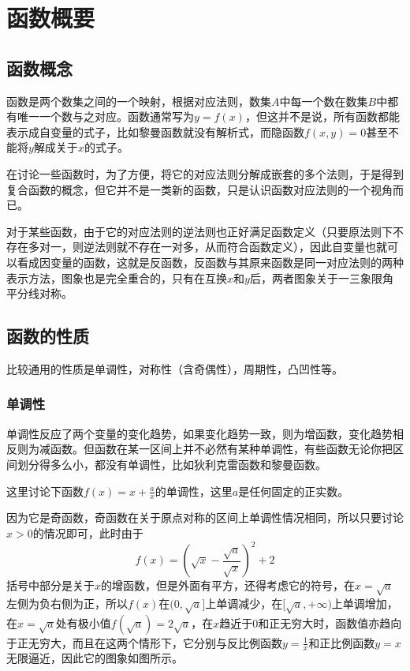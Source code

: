 
\section{函数概要}
\label{sec:function-general}


\subsection{函数概念}
\label{sec:function-general}

函数是两个数集之间的一个映射，根据对应法则，数集$A$中每一个数在数集$B$中都有唯一一个数与之对应。函数通常写为$y=f(x)$，但这并不是说，所有函数都能表示成自变量的式子，比如黎曼函数就没有解析式，而隐函数$f(x,y)=0$甚至不能将$y$解成关于$x$的式子。

在讨论一些函数时，为了方便，将它的对应法则分解成嵌套的多个法则，于是得到复合函数的概念，但它并不是一类新的函数，只是认识函数对应法则的一个视角而已。

对于某些函数，由于它的对应法则的逆法则也正好满足函数定义（只要原法则下不存在多对一，则逆法则就不存在一对多，从而符合函数定义），因此自变量也就可以看成因变量的函数，这就是反函数，反函数与其原来函数是同一对应法则的两种表示方法，图象也是完全重合的，只有在互换$x$和$y$后，两者图象关于一三象限角平分线对称。

\subsection{函数的性质}
\label{sec:function-general}

比较通用的性质是单调性，对称性（含奇偶性），周期性，凸凹性等。

\subsubsection{单调性}
\label{sec:function-general}

单调性反应了两个变量的变化趋势，如果变化趋势一致，则为增函数，变化趋势相反则为减函数。但函数在某一区间上并不必然有某种单调性，有些函数无论你把区间划分得多么小，都没有单调性，比如狄利克雷函数和黎曼函数。

这里讨论下函数$f(x)=x+\frac{a}{x}$的单调性，这里$a$是任何固定的正实数。

因为它是奇函数，奇函数在关于原点对称的区间上单调性情况相同，所以只要讨论$x>0$的情况即可，此时由于
$$
f(x)=\left( \sqrt{x}-\frac{\sqrt{a}}{\sqrt{x}} \right)^2+2
$$
括号中部分是关于$x$的增函数，但是外面有平方，还得考虑它的符号，在$x=\sqrt{a}$左侧为负右侧为正，所以$f(x)$在$(0,\sqrt{a}]$上单调减少，在$[\sqrt{a},+\infty)$上单调增加，在$x=\sqrt{a}$处有极小值$f(\sqrt{a})=2\sqrt{a}$，在$x$趋近于0和正无穷大时，函数值亦趋向于正无穷大，而且在这两个情形下，它分别与反比例函数$y=\frac{1}{x}$和正比例函数$y=x$无限逼近，因此它的图象如图所示。

